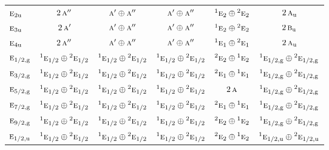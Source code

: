 \documentclass[10pt,a4paper]{article}
\numberwithin{equation}{section}
\newcommand{\irr}[1]{\text{\normalfont\scshape #1}}
\newcommand{\conjpair}[1]{{}^{#1}}
\newcommand{\ptag}[1]{\mathrm{#1}}
\begin{document}
{\begin{longtable}{@{}lccccc@{}}
$\irr{e}_{2\ptag{u}}$ & $2\,\irr{a}''$ & $\irr{a}'\oplus \irr{a}''$ & $\irr{a}'\oplus \irr{a}''$ & $\conjpair{1}\irr{e}_{2}\oplus \conjpair{2}\irr{e}_{2}$ & $2\,\irr{a}_{\ptag{u}}$\\
$\irr{e}_{3\ptag{u}}$ & $2\,\irr{a}'$ & $\irr{a}'\oplus \irr{a}''$ & $\irr{a}'\oplus \irr{a}''$ & $\conjpair{1}\irr{e}_{2}\oplus \conjpair{2}\irr{e}_{2}$ & $2\,\irr{b}_{\ptag{u}}$\\
$\irr{e}_{4\ptag{u}}$ & $2\,\irr{a}''$ & $\irr{a}'\oplus \irr{a}''$ & $\irr{a}'\oplus \irr{a}''$ & $\conjpair{1}\irr{e}_{1}\oplus \conjpair{2}\irr{e}_{1}$ & $2\,\irr{a}_{\ptag{u}}$\\
$\irr{e}_{1/2,\ptag{g}}$ & $\conjpair{1}\irr{e}_{1/2}\oplus \conjpair{2}\irr{e}_{1/2}$ & $\conjpair{1}\irr{e}_{1/2}\oplus \conjpair{2}\irr{e}_{1/2}$ & $\conjpair{1}\irr{e}_{1/2}\oplus \conjpair{2}\irr{e}_{1/2}$ & $\conjpair{2}\irr{e}_{2}\oplus \conjpair{1}\irr{e}_{2}$ & $\conjpair{1}\irr{e}_{1/2,\ptag{g}}\oplus \conjpair{2}\irr{e}_{1/2,\ptag{g}}$\\
$\irr{e}_{3/2,\ptag{g}}$ & $\conjpair{1}\irr{e}_{1/2}\oplus \conjpair{2}\irr{e}_{1/2}$ & $\conjpair{1}\irr{e}_{1/2}\oplus \conjpair{2}\irr{e}_{1/2}$ & $\conjpair{1}\irr{e}_{1/2}\oplus \conjpair{2}\irr{e}_{1/2}$ & $\conjpair{2}\irr{e}_{1}\oplus \conjpair{1}\irr{e}_{1}$ & $\conjpair{1}\irr{e}_{1/2,\ptag{g}}\oplus \conjpair{2}\irr{e}_{1/2,\ptag{g}}$\\
$\irr{e}_{5/2,\ptag{g}}$ & $\conjpair{1}\irr{e}_{1/2}\oplus \conjpair{2}\irr{e}_{1/2}$ & $\conjpair{1}\irr{e}_{1/2}\oplus \conjpair{2}\irr{e}_{1/2}$ & $\conjpair{1}\irr{e}_{1/2}\oplus \conjpair{2}\irr{e}_{1/2}$ & $2\,\irr{a}$ & $\conjpair{1}\irr{e}_{1/2,\ptag{g}}\oplus \conjpair{2}\irr{e}_{1/2,\ptag{g}}$\\
$\irr{e}_{7/2,\ptag{g}}$ & $\conjpair{1}\irr{e}_{1/2}\oplus \conjpair{2}\irr{e}_{1/2}$ & $\conjpair{1}\irr{e}_{1/2}\oplus \conjpair{2}\irr{e}_{1/2}$ & $\conjpair{1}\irr{e}_{1/2}\oplus \conjpair{2}\irr{e}_{1/2}$ & $\conjpair{2}\irr{e}_{1}\oplus \conjpair{1}\irr{e}_{1}$ & $\conjpair{1}\irr{e}_{1/2,\ptag{g}}\oplus \conjpair{2}\irr{e}_{1/2,\ptag{g}}$\\
$\irr{e}_{9/2,\ptag{g}}$ & $\conjpair{1}\irr{e}_{1/2}\oplus \conjpair{2}\irr{e}_{1/2}$ & $\conjpair{1}\irr{e}_{1/2}\oplus \conjpair{2}\irr{e}_{1/2}$ & $\conjpair{1}\irr{e}_{1/2}\oplus \conjpair{2}\irr{e}_{1/2}$ & $\conjpair{2}\irr{e}_{2}\oplus \conjpair{1}\irr{e}_{2}$ & $\conjpair{1}\irr{e}_{1/2,\ptag{g}}\oplus \conjpair{2}\irr{e}_{1/2,\ptag{g}}$\\
$\irr{e}_{1/2,\ptag{u}}$ & $\conjpair{1}\irr{e}_{1/2}\oplus \conjpair{2}\irr{e}_{1/2}$ & $\conjpair{1}\irr{e}_{1/2}\oplus \conjpair{2}\irr{e}_{1/2}$ & $\conjpair{1}\irr{e}_{1/2}\oplus \conjpair{2}\irr{e}_{1/2}$ & $\conjpair{2}\irr{e}_{2}\oplus \conjpair{1}\irr{e}_{2}$ & $\conjpair{1}\irr{e}_{1/2,\ptag{u}}\oplus \conjpair{2}\irr{e}_{1/2,\ptag{u}}$\\

\end{longtable}}
\end{document}
